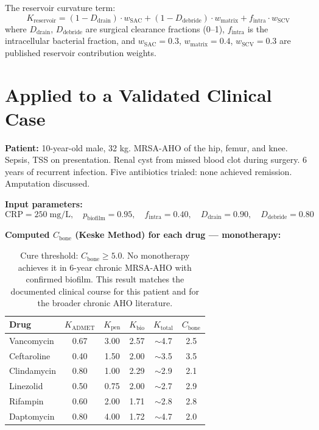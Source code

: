 \documentclass[11pt]{article}
\begin{document}
The reservoir curvature term:
\[
  K_{\text{reservoir}} = (1 - D_{\text{drain}}) \cdot w_{\text{SAC}}
    + (1 - D_{\text{debride}}) \cdot w_{\text{matrix}}
    + f_{\text{intra}} \cdot w_{\text{SCV}}
\]
where $D_{\text{drain}}$, $D_{\text{debride}}$ are surgical clearance fractions
(0–1), $f_{\text{intra}}$ is the intracellular bacterial fraction, and
$w_{\text{SAC}} = 0.3$, $w_{\text{matrix}} = 0.4$, $w_{\text{SCV}} = 0.3$
are published reservoir contribution weights.

\section{Applied to a Validated Clinical Case}

\textbf{Patient:} 10-year-old male, 32 kg. MRSA-AHO of the hip, femur, and knee.
Sepsis, TSS on presentation. Renal cyst from missed blood clot during surgery.
6 years of recurrent infection. Five antibiotics trialed: none achieved remission.
Amputation discussed.

\textbf{Input parameters:}
\[
  \text{CRP} = 250 \;\text{mg/L}, \quad
  p_{\text{biofilm}} = 0.95, \quad
  f_{\text{intra}} = 0.40, \quad
  D_{\text{drain}} = 0.90, \quad
  D_{\text{debride}} = 0.80
\]

\textbf{Computed $C_{\text{bone}}$ (Keske Method) for each drug — monotherapy:}

\begin{table}[h!]
\centering
\small
\begin{tabular}{lccccc}
\toprule
\textbf{Drug} & \textbf{$K_{\text{ADMET}}$} & \textbf{$K_{\text{pen}}$} & \textbf{$K_{\text{bio}}$} & \textbf{$K_{\text{total}}$} & \textbf{$C_{\text{bone}}$} \\
\midrule
Vancomycin   & 0.67 & 3.00 & 2.57 & $\sim$4.7 & 2.5 \\
Ceftaroline  & 0.40 & 1.50 & 2.00 & $\sim$3.5 & 3.5 \\
Clindamycin  & 0.80 & 1.00 & 2.29 & $\sim$2.9 & 2.1 \\
Linezolid    & 0.50 & 0.75 & 2.00 & $\sim$2.7 & 2.9 \\
Rifampin     & 0.60 & 2.00 & 1.71 & $\sim$2.8 & 2.8 \\
Daptomycin   & 0.80 & 4.00 & 1.72 & $\sim$4.7 & 2.0 \\
\bottomrule
\end{tabular}
\caption{Cure threshold: $C_{\text{bone}} \geq 5.0$. No monotherapy achieves it
in 6-year chronic MRSA-AHO with confirmed biofilm. This result matches the
documented clinical course for this patient and for the broader chronic AHO
literature.}
\end{table}
\end{document}
